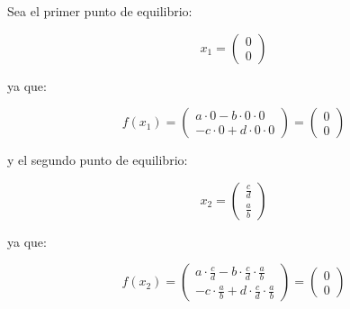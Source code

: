             Sea el primer punto de equilibrio:

            \begin{equation*}
                x_1 =
                \begin{pmatrix}
                    0 \\
                    0
                \end{pmatrix}
            \end{equation*}

            ya que:

            \begin{equation*}
                f(x_1) =
                \begin{pmatrix}
                    a \cdot 0 - b \cdot 0 \cdot 0 \\
                    -c \cdot 0 + d \cdot 0 \cdot 0
                \end{pmatrix} =
                \begin{pmatrix}
                    0 \\
                    0
                \end{pmatrix}
            \end{equation*}

            y el segundo punto de equilibrio:

            \begin{equation*}
                x_2 =
                \begin{pmatrix}
                    \frac{c}{d} \\
                    \frac{a}{b}
                \end{pmatrix}
            \end{equation*}

            ya que:

            \begin{equation*}
                f(x_2) =
                \begin{pmatrix}
                    a \cdot \frac{c}{d} - b \cdot \frac{c}{d} \cdot \frac{a}{b} \\
                    -c \cdot \frac{a}{b} + d \cdot \frac{c}{d} \cdot \frac{a}{b}
                \end{pmatrix} =
                \begin{pmatrix}
                    0 \\
                    0
                \end{pmatrix}
            \end{equation*}

